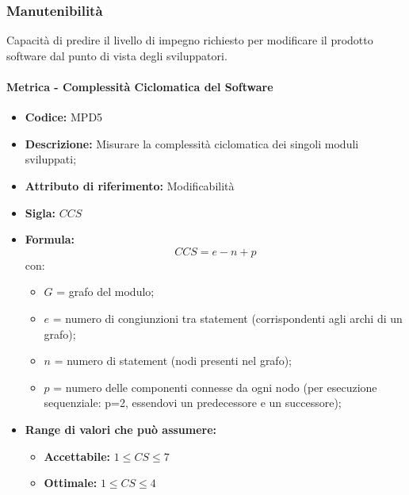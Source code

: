 \subsubsection{Manutenibilità} 
Capacità di predire il livello di impegno richiesto per modificare il prodotto software dal punto di vista degli sviluppatori.           
\paragraph{Metrica - Complessità Ciclomatica del Software} 
    \begin{itemize}
    \item \textbf{Codice:} MPD5
    \item \textbf{Descrizione:} Misurare la complessità ciclomatica dei singoli moduli sviluppati;
    \item \textbf{Attributo di riferimento:} Modificabilità
    \item \textbf{Sigla:} $CCS$
    \item \textbf{Formula:} $$CCS = e - n + p$$
    con:
    \begin{itemize}
        \item $G$ = grafo del modulo;
        \item $e$ = numero di congiunzioni tra statement (corrispondenti agli archi di un grafo);
        \item $n$ = numero di statement (nodi presenti nel grafo);
        \item $p$ = numero delle componenti connesse da ogni nodo (per esecuzione sequenziale: p=2, essendovi un predecessore e un successore);
    \end{itemize}

    \item \textbf{Range di valori che può assumere:}
    \begin{itemize}
        \item \textbf{Accettabile:} $1 \leq CS \leq 7 $
        \item \textbf{Ottimale:} $ 1 \leq CS \leq 4 $
    \end{itemize}
\end{itemize}

